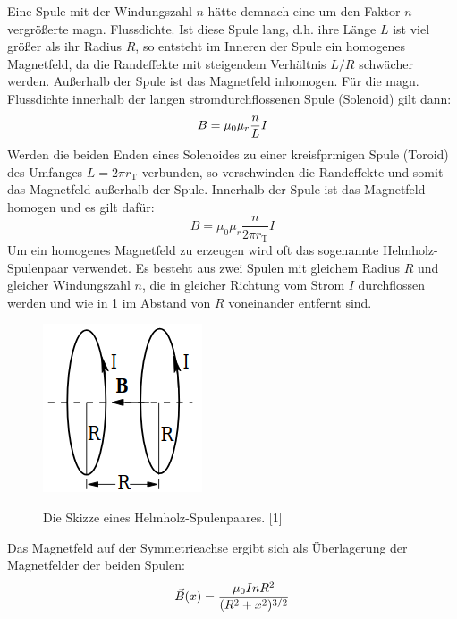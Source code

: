 \documentclass[titlepage = firstcover]{scrartcl}
\begin{document}
      \FloatBarrier
      Eine Spule mit der Windungszahl $n$ hätte demnach eine um den Faktor $n$ vergrößerte magn. Flussdichte. Ist diese Spule lang, d.h. ihre Länge $L$ ist
      viel größer als ihr Radius $R$, so entsteht im Inneren der Spule ein homogenes Magnetfeld, da die Randeffekte mit steigendem Verhältnis $L/R$ schwächer
      werden. Außerhalb der Spule ist das Magnetfeld inhomogen. Für die magn. Flussdichte innerhalb der langen stromdurchflossenen Spule (Solenoid) gilt dann:
      \begin{equation}
        B = \mu_0 \mu_r \frac{n}{L} I \\
        \label{eqn:BFormel}
      \end{equation}
      Werden die beiden Enden eines Solenoides zu einer kreisfprmigen Spule (Toroid) des Umfanges $L = 2 \pi r_\text{T}$ verbunden, so verschwinden die Randeffekte und somit das Magnetfeld
      außerhalb der Spule. Innerhalb der Spule ist das Magnetfeld homogen und es gilt dafür:
      \begin{equation}
        B = \mu_0 \mu_r \frac{n}{2 \pi r_\text{T}} I
      \end{equation}
      Um ein homogenes Magnetfeld zu erzeugen wird oft das sogenannte Helmholz-Spulenpaar verwendet. Es besteht aus zwei Spulen mit gleichem Radius $R$ und
      gleicher Windungszahl $n$, die in gleicher Richtung vom Strom $I$ durchflossen werden und wie in \ref{fig:helmholz} im Abstand von $R$ voneinander entfernt sind.
      \begin{figure}[h]
        \centering
        \caption{Die Skizze eines Helmholz-Spulenpaares. [1]}
        \includegraphics[width = 0.25\linewidth]{Helmholzspulenpaar.png}
        \label{fig:helmholz}
      \end{figure}
      \FloatBarrier
      \noindent
      Das Magnetfeld auf der Symmetrieachse ergibt sich als Überlagerung der Magnetfelder der beiden Spulen:
      \begin{equation}
        \vec{B}(x) = \frac{\mu_0 I n R^2}{(R^2 + x^2)^{3/2}} \\
        \label{eqn:FormelHelm}
      \end{equation}
\end{document}
